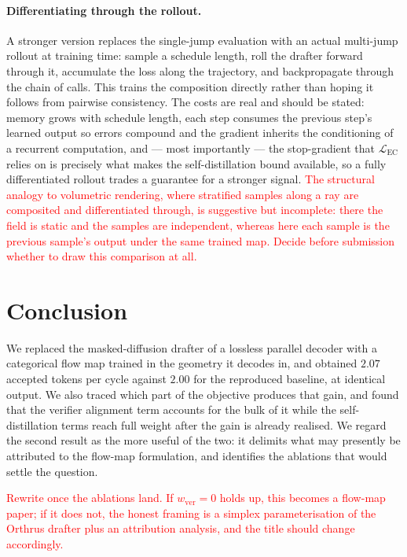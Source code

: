 \documentclass{zapiski}
\newcommand{\cm}[1]{\textcolor{red}{#1}}
\begin{document}
\paragraph{Differentiating through the rollout.} A stronger version replaces
the single-jump evaluation with an actual multi-jump rollout at training time:
sample a schedule length, roll the drafter forward through it, accumulate the
loss along the trajectory, and backpropagate through the chain of calls. This
trains the composition directly rather than hoping it follows from pairwise
consistency. The costs are real and should be stated: memory grows with
schedule length, each step consumes the previous step's learned output so
errors compound and the gradient inherits the conditioning of a recurrent
computation, and --- most importantly --- the stop-gradient that
$\mathcal{L}_{\mathrm{EC}}$ relies on is precisely what makes the
self-distillation bound available, so a fully differentiated rollout trades a
guarantee for a stronger signal. \cm{The structural analogy to volumetric
rendering, where stratified samples along a ray are composited and
differentiated through, is suggestive but incomplete: there the field is static
and the samples are independent, whereas here each sample is the previous
sample's output under the same trained map. Decide before submission whether to
draw this comparison at all.}

\section{Conclusion}
\label{sec:conclusion}

We replaced the masked-diffusion drafter of a lossless parallel decoder with a
categorical flow map trained in the geometry it decodes in, and obtained
$2.07$ accepted tokens per cycle against $2.00$ for the reproduced baseline, at
identical output. We also traced which part of the objective produces that
gain, and found that the verifier alignment term accounts for the bulk of it
while the self-distillation terms reach full weight after the gain is already
realised. We regard the second result as the more useful of the two: it
delimits what may presently be attributed to the flow-map formulation, and
identifies the ablations that would settle the question.

\cm{Rewrite once the ablations land. If $w_{\mathrm{ver}} = 0$ holds up, this
becomes a flow-map paper; if it does not, the honest framing is a simplex
parameterisation of the Orthrus drafter plus an attribution analysis, and the
title should change accordingly.}
\end{document}
